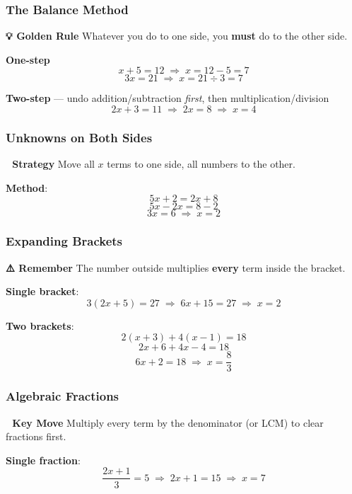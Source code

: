\documentclass[
  letterpaper,
  DIV=11,
  numbers=noendperiod]{scrreprt}
\theoremstyle{definition}
\theoremstyle{remark}
\begin{document}
\subsubsection*{The Balance Method}\label{the-balance-method}

\textbf{💡 Golden Rule} Whatever you do to one side, you \textbf{must}
do to the other side.

\textbf{One-step} \[x + 5 = 12 \;\Rightarrow\; x = 12 - 5 = 7\]
\[3x = 21 \;\Rightarrow\; x = 21 \div 3 = 7\]

\textbf{Two-step} --- undo addition/subtraction \emph{first}, then
multiplication/division
\[2x + 3 = 11 \;\Rightarrow\; 2x = 8 \;\Rightarrow\; x = 4\]

\subsubsection*{Unknowns on Both Sides}\label{unknowns-on-both-sides}

\textbf{🎯 Strategy} Move all \(x\) terms to one side, all numbers to
the other.

\textbf{Method}: \[5x + 2 = 2x + 8\] \[5x - 2x = 8 - 2\]
\[3x = 6 \;\Rightarrow\; x = 2\]

\subsubsection*{Expanding Brackets}\label{expanding-brackets}

\textbf{⚠️ Remember} The number outside multiplies \textbf{every} term
inside the bracket.

\textbf{Single bracket}:
\[3(2x + 5) = 27 \;\Rightarrow\; 6x + 15 = 27 \;\Rightarrow\; x = 2\]

\textbf{Two brackets}: \[2(x + 3) + 4(x - 1) = 18\]
\[2x + 6 + 4x - 4 = 18\]
\[6x + 2 = 18 \;\Rightarrow\; x = \dfrac{8}{3}\]

\subsubsection*{Algebraic Fractions}\label{algebraic-fractions}

\textbf{📝 Key Move} Multiply every term by the denominator (or LCM) to
clear fractions first.

\textbf{Single fraction}:
\[\dfrac{2x + 1}{3} = 5 \;\Rightarrow\; 2x + 1 = 15 \;\Rightarrow\; x = 7\]
\end{document}
